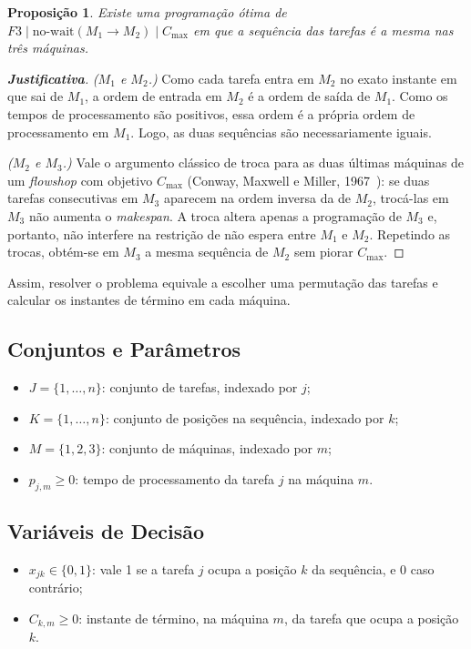 \documentclass[11pt,a4paper]{article}
\newtheorem{proposicao}{Proposição}
\begin{document}
\begin{proposicao}
\label{prop:permutacao}
Existe uma programação ótima de $F3 \mid \text{no-wait}(M_1 \to M_2) \mid C_{\max}$ em que a sequência das tarefas é a mesma nas três máquinas.
\end{proposicao}

\begin{proof}[\textbf{Justificativa}]
\emph{($M_1$ e $M_2$.)} Como cada tarefa entra em $M_2$ no exato instante em que sai de $M_1$, a ordem de entrada em $M_2$ é a ordem de saída de $M_1$. Como os tempos de processamento são positivos, essa ordem é a própria ordem de processamento em $M_1$. Logo, as duas sequências são necessariamente iguais.

\emph{($M_2$ e $M_3$.)} Vale o argumento clássico de troca para as duas últimas máquinas de um \textit{flowshop} com objetivo $C_{\max}$ (Conway, Maxwell e Miller, 1967~\cite{conway1967}): se duas tarefas consecutivas em $M_3$ aparecem na ordem inversa da de $M_2$, trocá-las em $M_3$ não aumenta o \textit{makespan}. A troca altera apenas a programação de $M_3$ e, portanto, não interfere na restrição de não espera entre $M_1$ e $M_2$. Repetindo as trocas, obtém-se em $M_3$ a mesma sequência de $M_2$ sem piorar $C_{\max}$.
\end{proof}

Assim, resolver o problema equivale a escolher uma permutação das tarefas e calcular os instantes de término em cada máquina.

\subsection{Conjuntos e Parâmetros}
\begin{itemize}
    \item $J = \{1,\dots,n\}$: conjunto de tarefas, indexado por $j$;
    \item $K = \{1,\dots,n\}$: conjunto de posições na sequência, indexado por $k$;
    \item $M = \{1,2,3\}$: conjunto de máquinas, indexado por $m$;
    \item $p_{j,m} \ge 0$: tempo de processamento da tarefa $j$ na máquina $m$.
\end{itemize}

\subsection{Variáveis de Decisão}
\begin{itemize}
    \item $x_{jk} \in \{0,1\}$: vale 1 se a tarefa $j$ ocupa a posição $k$ da sequência, e 0 caso contrário;
    \item $C_{k,m} \ge 0$: instante de término, na máquina $m$, da tarefa que ocupa a posição $k$.
\end{itemize}
\end{document}
